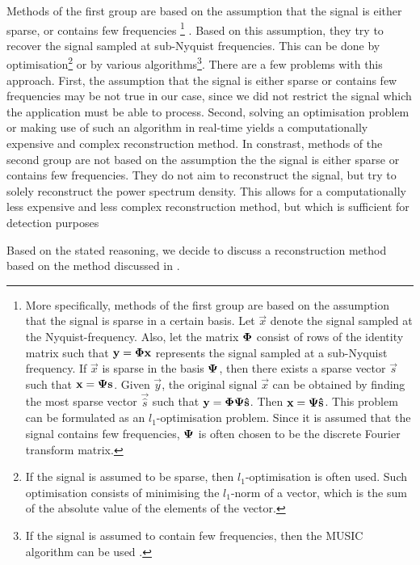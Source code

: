 \documentclass[a4paper, openany, oneside]{memoir}
\begin{document}
Methods of the first group are based on the assumption that the signal is either sparse, or contains few frequencies%
\footnote{More specifically, methods of the first group are based on the assumption that the signal is sparse in a certain basis. Let $\vec{x}$ denote the signal sampled at the Nyquist-frequency. Also, let the matrix $\boldsymbol{\mathbf{\Phi}}$ consist of rows of the identity matrix such that $\boldsymbol{\mathbf{y}}=\boldsymbol{\mathbf{\Phi}}\boldsymbol{\mathbf{x}}$ represents the signal sampled at a sub-Nyquist frequency. If $\vec{x}$ is sparse in the basis $\boldsymbol{\mathbf{\Psi}}$, then there exists a sparse vector $\vec{s}$ such that $\boldsymbol{\mathbf{x}}=\boldsymbol{\mathbf{\Psi}}\boldsymbol{\mathbf{s}}$. Given $\vec{y}$, the original signal $\vec{x}$ can be obtained by finding the most sparse vector $\vec{\hat{s}}$ such that $\boldsymbol{\mathbf{y}}=\boldsymbol{\mathbf{\Phi}}\boldsymbol{\mathbf{\Psi}}\boldsymbol{\mathbf{\hat{s}}}$. Then $\boldsymbol{\mathbf{x}} = \boldsymbol{\mathbf{\Psi}}\boldsymbol{\mathbf{\hat{s}}}$. This problem can be formulated as an $l_1$-optimisation problem. Since it is assumed that the signal contains few frequencies, $\boldsymbol{\mathbf{\Psi}}$ is often chosen to be the discrete Fourier transform matrix.}%
. Based on this assumption, they try to recover the signal sampled at sub-Nyquist frequencies. This can be done by optimisation\footnote{If the signal is assumed to be sparse, then $l_1$-optimisation is often used. Such optimisation consists of minimising the $l_1$-norm of a vector, which is the sum of the absolute value of the elements of the vector.} or by various algorithms\footnote{If the signal is assumed to contain few frequencies, then the MUSIC algorithm can be used \cite{pal2011coprime}.}. There are a few problems with this approach. First, the assumption that the signal is either sparse or contains few frequencies may be not true in our case, since we did not restrict the signal which the application must be able to process. Second, solving an optimisation problem or making use of such an algorithm in real-time yields a computationally expensive and complex reconstruction method. In constrast, methods of the second group are not based on the assumption the the signal is either sparse or contains few frequencies. They do not aim to reconstruct the signal, but try to solely reconstruct the power spectrum density. This allows for a computationally less expensive and less complex reconstruction method, but which is sufficient for detection purposes

Based on the stated reasoning, we decide to discuss a reconstruction method based on the method discussed in \cite{ariananda2012compressive}.
\end{document}
